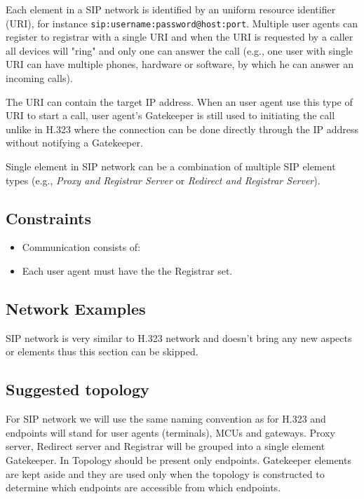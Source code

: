 \documentclass[a4paper]{report}
\begin{document}
Each element in a SIP network is identified by an uniform resource identifier (URI), for instance \verb|sip:username:password@host:port|. Multiple user agents can register to registrar with a single URI and when the URI is requested by a caller all devices will "ring" and only one can answer the call (e.g., one user with single URI can have multiple phones, hardware or software, by which he can answer an incoming calls).

The URI can contain the target IP address. When an user agent use this type of URI to start a call, user agent's Gatekeeper is still used to initiating the call unlike in H.323 where the connection can be done directly through the IP address without notifying a Gatekeeper.

Single element in SIP network can be a combination of multiple SIP element types (e.g., \emph{Proxy and Registrar Server} or \emph{Redirect and Registrar Server}).

\subsection{Constraints}

\begin{itemize}

\item Communication consists of:

\item Each user agent must have the the Registrar set.

\end{itemize}

\subsection{Network Examples}

SIP network is very similar to H.323 network and doesn't bring any new aspects or elements thus this section can be skipped.

\subsection{Suggested topology}

For SIP network we will use the same naming convention as for H.323 and endpoints will stand for user agents (terminals), MCUs and gateways. Proxy server, Redirect server and Registrar will be grouped into a single element Gatekeeper. In Topology should be present only endpoints. Gatekeeper elements are kept aside and they are used only when the topology is constructed to determine which endpoints are accessible from which endpoints.
\end{document}
